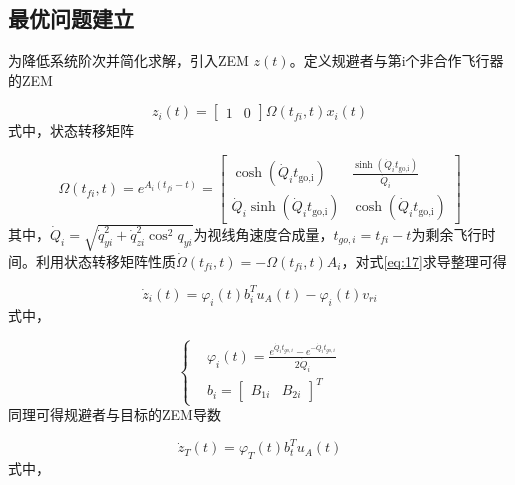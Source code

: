 \subsection{最优问题建立}
为降低系统阶次并简化求解，引入ZEM $z(t)$。定义规避者与第i个非合作飞行器的ZEM

\begin{equation}
\label{eq:17}
{z_i}(t) = \left[ {\begin{array}{*{20}{c}}
  1&0 
\end{array}} \right]\Omega \left( {{t_{fi}},t} \right){x_i}(t)
\end{equation}
式中，状态转移矩阵

\begin{equation}
\label{eq:18}
\Omega \left( {{t_{fi}},t} \right) = {e^{{A_i}\left( {{t_{fi}} - t} \right)}} = \left[ {\begin{array}{*{20}{c}}
  {\cosh ({{\dot Q}_i}{t_{{\text{go,i}}}})}&{\frac{{\sinh ({{\dot Q}_i}{t_{{\text{go,i}}}})}}{{{{\dot Q}_i}}}} \\ 
  {{{\dot Q}_i}\sinh ({{\dot Q}_i}{t_{{\text{go,i}}}})}&{\cosh ({{\dot Q}_i}{t_{{\text{go,i}}}})} 
\end{array}} \right]
\end{equation}
其中，${\dot Q_i} = \sqrt {\dot q_{yi}^2 + \dot q_{zi}^2{{\cos }^2}{q_{yi}}} $为视线角速度合成量，${t_{go,i}} = {t_{fi}} - t$为剩余飞行时间。利用状态转移矩阵性质$\dot \Omega \left( {{t_{fi}},t} \right) =  - \Omega \left( {{t_{fi}},t} \right){A_i}$，对式\eqref{eq:17}求导整理可得

\begin{equation}
\label{eq:19}
{\dot z_i}(t) = {\varphi _i}(t)b_i^T{u_A}(t) - {\varphi _i}(t){v_{ri}}
\end{equation}
式中，

\begin{equation}
\label{eq:20}
\left\{
\begin{aligned}
& {\varphi _i}(t) = \frac{{{e^{{{\dot Q}_i}{t_{go,i}}}} - {e^{ - {{\dot Q}_i}{t_{go,i}}}}}}{{2{{\dot Q}_i}}} \\
& {b_i} = {\left[ {\begin{array}{*{20}{c}}
  {{B_{1i}}}&{{B_{2i}}}
\end{array}} \right]^T}
\end{aligned}
\right.
\end{equation}
同理可得规避者与目标的ZEM导数

\begin{equation}
\label{eq:21}
{\dot z_T}(t) = {\varphi _T}(t)b_t^T{u_A}(t)
\end{equation}
式中，

